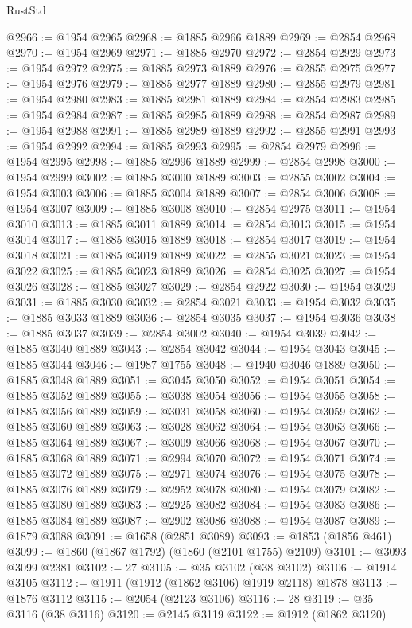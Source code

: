 \begin{lexlean}{RustStd}
\begin{coremodule}
@2966 := @1954 @2965
@2968 := @1885 @2966 @1889
@2969 := @2854 @2968
@2970 := @1954 @2969
@2971 := @1885 @2970
@2972 := @2854 @2929
@2973 := @1954 @2972
@2975 := @1885 @2973 @1889
@2976 := @2855 @2975
@2977 := @1954 @2976
@2979 := @1885 @2977 @1889
@2980 := @2855 @2979
@2981 := @1954 @2980
@2983 := @1885 @2981 @1889
@2984 := @2854 @2983
@2985 := @1954 @2984
@2987 := @1885 @2985 @1889
@2988 := @2854 @2987
@2989 := @1954 @2988
@2991 := @1885 @2989 @1889
@2992 := @2855 @2991
@2993 := @1954 @2992
@2994 := @1885 @2993
@2995 := @2854 @2979
@2996 := @1954 @2995
@2998 := @1885 @2996 @1889
@2999 := @2854 @2998
@3000 := @1954 @2999
@3002 := @1885 @3000 @1889
@3003 := @2855 @3002
@3004 := @1954 @3003
@3006 := @1885 @3004 @1889
@3007 := @2854 @3006
@3008 := @1954 @3007
@3009 := @1885 @3008
@3010 := @2854 @2975
@3011 := @1954 @3010
@3013 := @1885 @3011 @1889
@3014 := @2854 @3013
@3015 := @1954 @3014
@3017 := @1885 @3015 @1889
@3018 := @2854 @3017
@3019 := @1954 @3018
@3021 := @1885 @3019 @1889
@3022 := @2855 @3021
@3023 := @1954 @3022
@3025 := @1885 @3023 @1889
@3026 := @2854 @3025
@3027 := @1954 @3026
@3028 := @1885 @3027
@3029 := @2854 @2922
@3030 := @1954 @3029
@3031 := @1885 @3030
@3032 := @2854 @3021
@3033 := @1954 @3032
@3035 := @1885 @3033 @1889
@3036 := @2854 @3035
@3037 := @1954 @3036
@3038 := @1885 @3037
@3039 := @2854 @3002
@3040 := @1954 @3039
@3042 := @1885 @3040 @1889
@3043 := @2854 @3042
@3044 := @1954 @3043
@3045 := @1885 @3044
@3046 := @1987 @1755
@3048 := @1940 @3046 @1889
@3050 := @1885 @3048 @1889
@3051 := @3045 @3050
@3052 := @1954 @3051
@3054 := @1885 @3052 @1889
@3055 := @3038 @3054
@3056 := @1954 @3055
@3058 := @1885 @3056 @1889
@3059 := @3031 @3058
@3060 := @1954 @3059
@3062 := @1885 @3060 @1889
@3063 := @3028 @3062
@3064 := @1954 @3063
@3066 := @1885 @3064 @1889
@3067 := @3009 @3066
@3068 := @1954 @3067
@3070 := @1885 @3068 @1889
@3071 := @2994 @3070
@3072 := @1954 @3071
@3074 := @1885 @3072 @1889
@3075 := @2971 @3074
@3076 := @1954 @3075
@3078 := @1885 @3076 @1889
@3079 := @2952 @3078
@3080 := @1954 @3079
@3082 := @1885 @3080 @1889
@3083 := @2925 @3082
@3084 := @1954 @3083
@3086 := @1885 @3084 @1889
@3087 := @2902 @3086
@3088 := @1954 @3087
@3089 := @1879 @3088
@3091 := @1658 (@2851 @3089)
@3093 := @1853 (@1856 @461)
@3099 := @1860 (@1867 @1792) (@1860 (@2101 @1755) @2109)
@3101 := @3093 @3099 @2381
@3102 := 27
@3105 := @35 @3102 (@38 @3102)
@3106 := @1914 @3105
@3112 := @1911 (@1912 (@1862 @3106) @1919 @2118) @1878
@3113 := @1876 @3112
@3115 := @2054 (@2123 @3106)
@3116 := 28
@3119 := @35 @3116 (@38 @3116)
@3120 := @2145 @3119
@3122 := @1912 (@1862 @3120)

\end{coremodule}
\end{lexlean}
